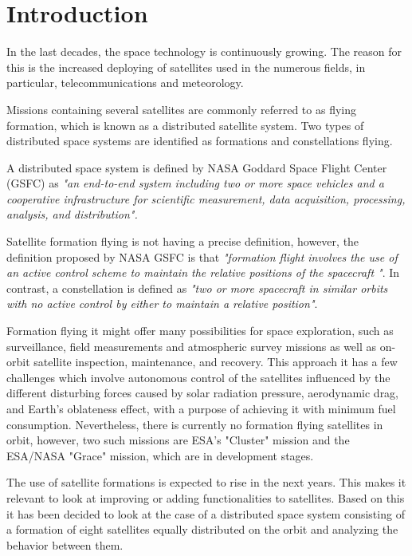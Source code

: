\chapter{Introduction}\label{chap:Introduction}
In the last decades, the space technology is continuously growing. The reason for this is the increased deploying of satellites used in the numerous fields, in particular, telecommunications and meteorology.  \cite{SIDI}

Missions containing several satellites are commonly referred to as flying formation, which is known as a distributed satellite system. Two types of distributed space systems are identified as formations and constellations flying. 

A distributed space system is defined by NASA Goddard Space Flight Center (GSFC) as \textit{"an end-to-end system including two or more space vehicles and a cooperative infrastructure for scientific measurement, data acquisition, processing, analysis, and distribution".} \cite{SFF}

Satellite formation flying is not having a precise definition, however, the definition proposed by NASA GSFC is that \textit{"formation flight involves the use of an active control scheme to maintain the relative positions of the spacecraft "}. In contrast, a constellation is defined as \textit{"two or more spacecraft in similar orbits with no active control by either to maintain a relative position"}. \cite{SF}

Formation flying it might offer many possibilities for space exploration, such as surveillance, field measurements and atmospheric survey missions as well as on-orbit satellite inspection, maintenance, and recovery. This approach it has a few challenges which involve autonomous control of the satellites influenced by the different disturbing forces caused by solar radiation pressure, aerodynamic drag, and Earth’s oblateness effect, with a purpose of achieving it with minimum fuel consumption. Nevertheless, there is currently no formation flying satellites in orbit, however, two such missions are ESA’s "Cluster" mission and the ESA/NASA "Grace" mission, which are in development stages. \cite{SF}

The use of satellite formations is expected to rise in the next years. This makes it relevant to look at improving or adding functionalities to satellites. Based on this it has been decided to look at the case of a distributed space system consisting of a formation of eight satellites equally distributed on the orbit and analyzing the behavior between them.
 \vspace{2cm}
